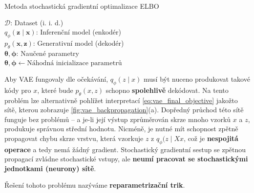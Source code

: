 \begin{algorithm}[H]
    \caption{Metoda stochastická gradientní optimalizace ELBO}\label{alg:reparam_trick}
        \KwData{}
                \hspace{6mm}$\mathcal{D}$: Dataset (i. i. d.)\\
                \hspace{6mm}$q_\phi(\textbf{z}\mid\textbf{x})$: Inferenční model (enkodér)\\
                \hspace{6mm}$p_\theta(\textbf{x}, \textbf{z})$: Generativní model (dekodér)\\
        \KwResult{}
        \hspace{6mm}$\boldsymbol{\theta}, \boldsymbol{\phi}$: Naučené parametry\\

        $\boldsymbol{\theta}, \boldsymbol{\phi} \gets \text{Náhodná inicializace parametrů}$

\end{algorithm}

Aby VAE fungovaly dle očekávání, $q_\phi(z\mid x)$ musí být nuceno produkovat takové kódy pro $x$, které bude $p_\theta(x, z)$ schopno \textbf{spolehlivě} dekódovat.
Na tento problém lze alternativně pohlížet interpretací \autoref{eq:vae_final_objective} jakožto sítě, kterou zobrazuje \autoref{fig:vae_backpropagation}(a).
Dopředný průchod této sítě funguje bez problémů – a je-li její výstup zprůměrován skrze mnoho vzorků $x$ a $z$, produkuje správnou střední hodnotu.
Nicméně, je nutné mít schopnost zpětně propagovat chybu skrze vrstvu, která vzorkuje $z$ z $q_\phi(z \mid Xx$, což je \textbf{nespojitá operace} a tedy nemá žádný gradient.
Stochastický gradientní sestup se zpětnou propagací zvládne stochastické vstupy, ale \textbf{neumí pracovat se stochastickými jednotkami (neurony) sítě}.

Řešení tohoto problému nazýváme \textbf{reparametrizační trik}.